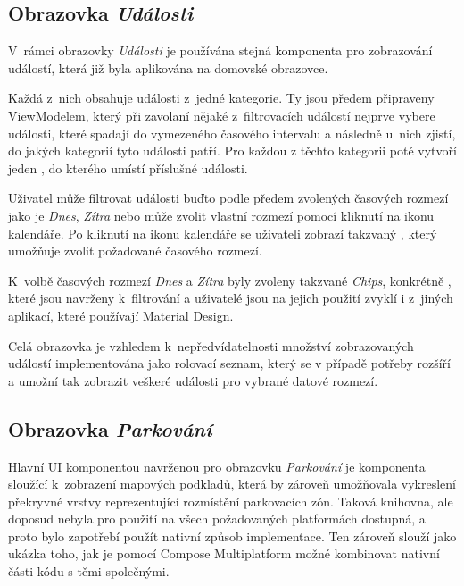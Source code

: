\subsection{Obrazovka \textit{Události}}

V~rámci obrazovky \textit{Události} je používána stejná komponenta pro zobrazování událostí, která již byla aplikována na domovské obrazovce. 


Každá z~nich obsahuje události z~jedné kategorie. Ty jsou předem připraveny ViewModelem, který při zavolaní nějaké z~filtrovacích
událostí nejprve vybere události, které spadají do vymezeného časového intervalu a následně u~nich zjistí, do jakých kategorií tyto
události patří. Pro každou z těchto kategorii poté vytvoří jeden , do kterého umístí příslušné události.

Uživatel může filtrovat události buďto podle předem zvolených časových rozmezí jako je \textit{Dnes}, \textit{Zítra} nebo může zvolit vlastní 
rozmezí pomocí kliknutí na ikonu kalendáře. Po kliknutí na ikonu kalendáře se uživateli zobrazí takzvaný , který umožňuje zvolit požadované časového rozmezí.

K~volbě časových rozmezí \textit{Dnes} a \textit{Zítra} byly zvoleny takzvané \textit{Chips}, konkrétně , které jsou 
navrženy k~filtrování a uživatelé jsou na jejich použití zvyklí i z~jiných aplikací, které používají Material Design.

Celá obrazovka je vzhledem k~nepředvídatelnosti množství zobrazovaných událostí implementována jako rolovací seznam, který se v případě potřeby
rozšíří a umožní tak zobrazit veškeré události pro vybrané datové rozmezí.

\subsection{Obrazovka \textit{Parkování}} \label{parkingScreenImpl}
Hlavní UI komponentou navrženou pro obrazovku \textit{Parkování} je komponenta sloužící k~zobrazení mapových podkladů, která by zároveň umožňovala 
vykreslení překryvné vrstvy reprezentující rozmístění parkovacích zón. Taková knihovna, ale doposud nebyla pro použití na všech požadovaných 
platformách dostupná, a proto bylo zapotřebí použít nativní způsob implementace. Ten zároveň slouží jako ukázka toho, jak je pomocí 
Compose Multiplatform možné kombinovat nativní části kódu s těmi společnými.

